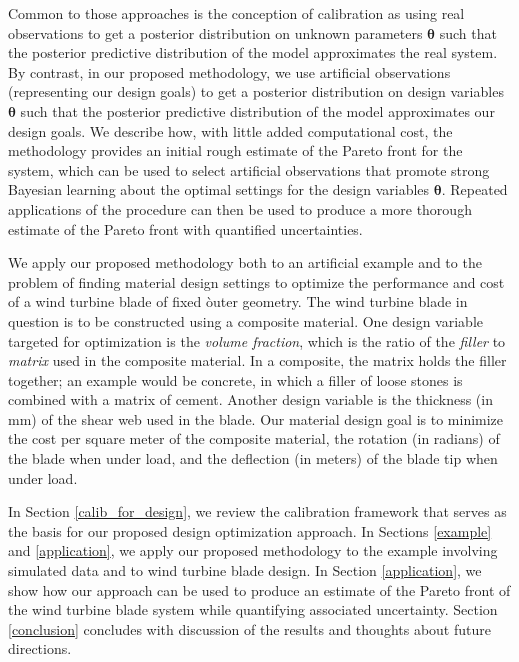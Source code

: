 \documentclass[12pt]{article}
\begin{document}
%
Common to those approaches is the conception of calibration as using real observations to get a posterior distribution on unknown parameters $\boldsymbol\theta$ such that the posterior predictive distribution of the model approximates the real system.
%
By contrast, in our proposed methodology, we use artificial observations (representing our design goals) to get a posterior distribution on design variables $\boldsymbol\theta$ such that the posterior predictive distribution of the model approximates our design goals.
%
We describe how, with little added computational cost, the methodology provides an initial rough estimate of the Pareto front for the system, which can be used to select artificial observations that promote strong Bayesian learning about the optimal settings for the design variables $\boldsymbol\theta$.
%
Repeated applications of the procedure can then be used to produce a more thorough estimate of the Pareto front with quantified uncertainties.
%

%
We apply our proposed methodology both to an artificial example and to the problem of finding material design settings to optimize the performance and cost of a wind turbine blade of fixed òuter geometry.
%
The wind turbine blade in question is to be constructed using a composite material.
%
One design variable targeted for optimization is the \emph{volume fraction}, which is the ratio of the \emph{filler} to \emph{matrix} used in the composite material.
%
In a composite, the matrix holds the filler together; an example would be concrete, in which a filler of loose stones is combined with a matrix of cement.
%
Another design variable is the thickness (in mm) of the shear web used in the blade.
%
Our material design goal is to minimize the cost per square meter of the composite material, the rotation (in radians) of the blade when under load, and the deflection (in meters) of the blade tip when under load.
%

%
In Section \ref{calib_for_design}, we review the calibration framework that serves as the basis for our proposed design optimization approach. 
%
In Sections \ref{example} and \ref{application}, we apply our proposed methodology to the example involving simulated data and to wind turbine blade design.
%
In Section \ref{application}, we show how our approach can be used to produce an estimate of the Pareto front of the wind turbine blade system while quantifying associated uncertainty.
%
Section \ref{conclusion} concludes with discussion of the results and thoughts about future directions.
\end{document}
